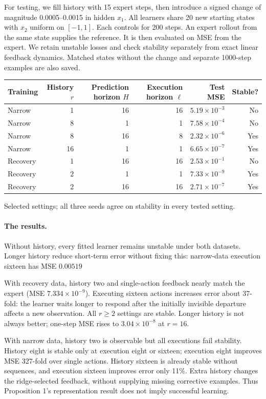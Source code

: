\documentclass{l4dc2026}
\begin{document}
For testing, we fill history with 15 expert steps, then introduce a signed change of magnitude 0.0005--0.0015 in hidden $x_1$. All learners share 20 new starting states with $x_2$ uniform on $[-1,1]$. Each controls for 200 steps. An expert rollout from the same state supplies the reference. It is then evaluated on MSE from the expert. We retain unstable losses and check stability separately from exact linear feedback dynamics. Matched states without the change and separate 1000-step examples are also saved.

\begin{center}\small
\begin{tabular}{lrrrrr}\toprule
Training & History $r$ & Prediction horizon $H$ & Execution horizon $\ell$ & Test MSE & Stable?\\\midrule
Narrow & 1 & 16 & 16 & $5.19\times10^{-3}$ & No\\
Narrow & 8 & 1 & 1 & $7.58\times10^{-4}$ & No\\
Narrow & 8 & 16 & 8 & $2.32\times10^{-6}$ & Yes\\
Narrow & 16 & 1 & 1 & $6.65\times10^{-7}$ & Yes\\
Recovery & 1 & 16 & 16 & $2.53\times10^{-1}$ & No\\
Recovery & 2 & 1 & 1 & $7.33\times10^{-9}$ & Yes\\
Recovery & 2 & 16 & 16 & $2.71\times10^{-7}$ & Yes\\\bottomrule
\end{tabular}
\end{center}
\noindent Selected settings; all three seeds agree on stability in every tested setting.

\paragraph{The results.}
Without history, every fitted learner remains unstable under both datasets. Longer history reduce short-term error without fixing this: narrow-data execution sixteen has MSE $0.00519$

With recovery data, history two and single-action feedback nearly match the expert (MSE $7.334\times10^{-9}$). Executing sixteen actions increases error about 37-fold: the learner waits longer to respond after the initially invisible departure affects a new observation. All $r\ge2$ settings are stable. Longer history is not always better; one-step MSE rises to $3.04\times10^{-8}$ at $r=16$.

With narrow data, history two is observable but all executions fail stability. History eight is stable only at execution eight or sixteen; execution eight improves MSE 327-fold over single actions. History sixteen is already stable without sequences, and execution sixteen improves error only 11\%. Extra history changes the ridge-selected feedback, without supplying missing corrective examples. Thus Proposition 1's representation result does not imply successful learning.
\end{document}
